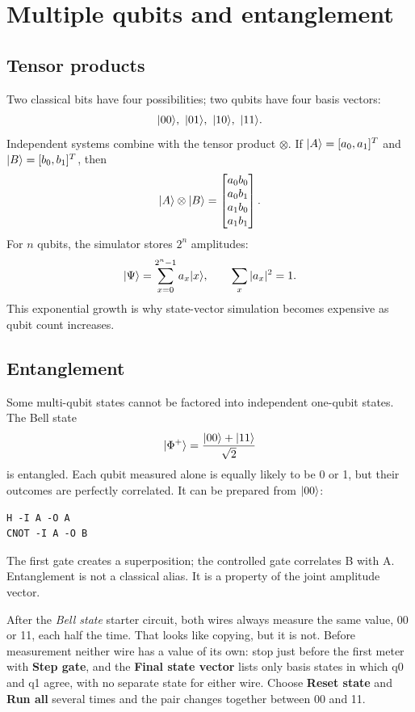 \section{Multiple qubits and entanglement}

\subsection{Tensor products}

Two classical bits have four possibilities; two qubits have four basis vectors:
\[
\ket{00},\ \ket{01},\ \ket{10},\ \ket{11}.
\]
Independent systems combine with the tensor product $\otimes$. If
$\lvert A\rangle=[a_0,a_1]^T$ and $\lvert B\rangle=[b_0,b_1]^T$, then
\[
\lvert A\rangle\otimes\lvert B\rangle=
\begin{bmatrix}
a_0b_0\\a_0b_1\\a_1b_0\\a_1b_1
\end{bmatrix}.
\]
For $n$ qubits, the simulator stores $2^n$ amplitudes:
\[
\lvert \Psi\rangle=\sum_{x=0}^{2^n-1}a_x\lvert x\rangle,\qquad
\sum_x|a_x|^2=1.
\]
This exponential growth is why state-vector simulation becomes expensive as
qubit count increases.

\subsection{Entanglement}

Some multi-qubit states cannot be factored into independent one-qubit states.
The Bell state
\[
\lvert \Phi^+\rangle=\frac{\lvert 00\rangle+\lvert 11\rangle}{\sqrt2}
\]
is entangled. Each qubit measured alone is equally likely to be 0 or 1, but
their outcomes are perfectly correlated. It can be prepared from $\lvert 00\rangle$:
\begin{lstlisting}
H -I A -O A
CNOT -I A -O B
\end{lstlisting}
The first gate creates a superposition; the controlled gate correlates B with
A. Entanglement is not a classical alias. It is a property of the joint
amplitude vector.

\begin{beginnerbox}
After the \emph{Bell state} starter circuit, both wires always measure the
same value, 00 or 11, each half the time. That looks like copying, but it is
not. Before measurement neither wire has a value of its own: stop just before
the first meter with \textbf{Step gate}, and the \textbf{Final state
vector} lists only basis states in which q0 and q1 agree, with no separate
state for either wire. Choose \textbf{Reset state} and \textbf{Run all}
several times and the pair changes together between 00 and 11.
\end{beginnerbox}

